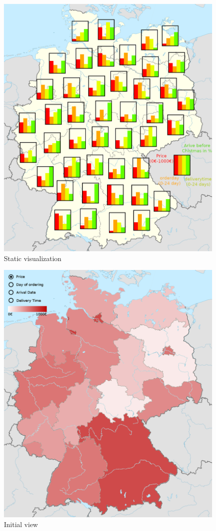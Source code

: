 \documentclass[a4paper]{article}
\begin{document}
\begin{figure}[!ht]
	\centering
	\includegraphics[width=0.7\linewidth]{germany-2b}
	\caption{Static visualization}
	\label{fig:germany-2b}
\end{figure}

\begin{figure}[!ht]
	\centering
	\includegraphics[width=0.7\linewidth]{germany-2c1}
	\caption{Initial view}
	\label{fig:germany-2c1}
\end{figure}
\end{document}
